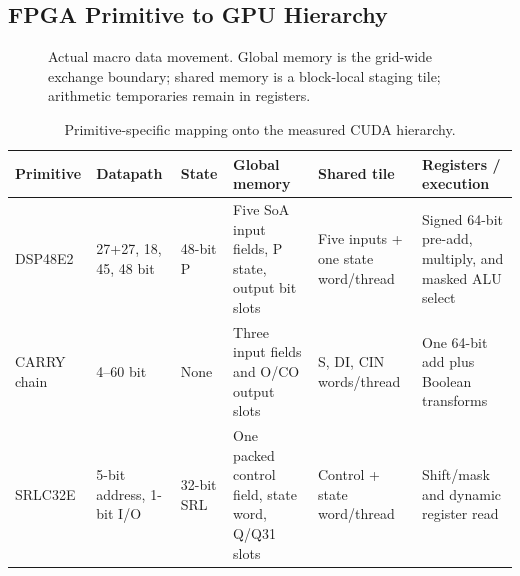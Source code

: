 \documentclass[11pt,a4paper]{article}
\begin{document}
\subsection{FPGA Primitive to GPU Hierarchy}

\begin{figure}[H]
\centering
{}
\caption{Actual macro data movement.  Global memory is the grid-wide exchange boundary; shared memory is a block-local staging tile; arithmetic temporaries remain in registers.}
\label{fig:memory}
\end{figure}

\begin{table}[H]
\centering
\caption{Primitive-specific mapping onto the measured CUDA hierarchy.}
\begin{tabularx}{\textwidth}{P{24mm} C{20mm} C{17mm} Y Y Y}
\toprule
Primitive & Datapath & State & Global memory & Shared tile & Registers / execution \\
\midrule
DSP48E2 & 27+27, 18, 45, 48 bit & 48-bit P & Five SoA input fields, P state, output bit slots & Five inputs + one state word/thread & Signed 64-bit pre-add, multiply, and masked ALU select \\
CARRY chain & 4--60 bit & None & Three input fields and O/CO output slots & S, DI, CIN words/thread & One 64-bit add plus Boolean transforms \\
SRLC32E & 5-bit address, 1-bit I/O & 32-bit SRL & One packed control field, state word, Q/Q31 slots & Control + state word/thread & Shift/mask and dynamic register read \\
\bottomrule
\end{tabularx}
\end{table}
\end{document}
